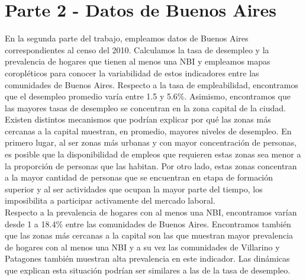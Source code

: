 \documentclass[11pt,a4paper]{article}
\begin{document}
\clearpage
\section*{Parte 2 - Datos de Buenos Aires}

En la segunda parte del trabajo, empleamos datos de Buenos Aires correspondientes al censo del 2010. Calculamos la tasa de desempleo y la prevalencia de hogares que tienen al menos una NBI y empleamos mapas coropléticos para conocer la variabilidad de estos indicadores entre las comunidades de Buenos Aires. Respecto a la tasa de empleabilidad, encontramos que el desempleo promedio varía entre 1.5 y 5.6\%. Asimismo, encontramos que las mayores tasas de desempleo se concentran en la zona capital de la ciudad. Existen distintos mecanismos que podrían explicar por qué las zonas más cercanas a la capital muestran, en promedio, mayores niveles de desempleo. En primero lugar, al ser zonas más urbanas y con mayor concentración de personas, es posible que la disponibilidad de empleos que requieren estas zonas sea menor a la proporción de personas que las habitan. Por otro lado, estas zonas concentran a la mayor cantidad de personas que se encuentran en etapa de formación superior y al ser actividades que ocupan la mayor parte del tiempo, los imposibilita a participar activamente del mercado laboral.\\ 
Respecto a la prevalencia de hogares con al menos una NBI, encontramos varían desde 1 a 18.4\% entre las comunidades de Buenos Aires. Encontramos también que las zonas más cercanas a la capital son las que muestran mayor prevalencia de hogares con al menos una NBI y a su vez las comunidades de Villarino y Patagones también muestran alta prevalencia en este indicador. Las dinámicas que explican esta situación podrían ser similares a las de la tasa de desempleo. 
\end{document}
